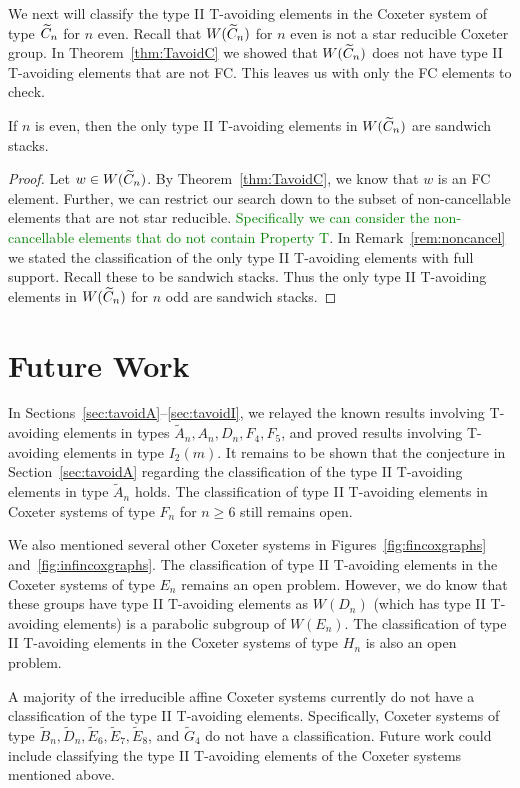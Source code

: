 We next will classify the type II T-avoiding elements in the Coxeter system of type $\widetilde{C}_n$ for $n$ even. Recall that $W(\widetilde{C}_n)$ for $n$ even is not a star reducible Coxeter group. In Theorem~\ref{thm:TavoidC} we showed that $W(\widetilde{C}_n)$ does not have type II T-avoiding elements that are not FC. This leaves us with only the FC elements to check.

\begin{theorem}
	If $n$ is even, then the only type II T-avoiding elements in $W(\widetilde{C}_n)$ are sandwich stacks.
	\begin{proof}
		Let $w \in W(\widetilde{C}_n)$. By Theorem~\ref{thm:TavoidC}, we know that $w$ is an FC element. Further, we can restrict our search down to the subset of non-cancellable elements that are not star reducible. \textcolor{green}{Specifically we can consider the non-cancellable elements that do not contain Property T}. In Remark~\ref{rem:noncancel} we stated the classification of the only type II T-avoiding elements with full support. Recall these to be sandwich stacks. Thus the only type II T-avoiding elements in $W(\widetilde{C}_n)$ for $n$ odd are sandwich stacks.
	\end{proof}
\end{theorem}


\section{Future Work}\label{sec:open}
In Sections~\ref{sec:tavoidA}--\ref{sec:tavoidI}, we relayed the known results involving T-avoiding elements in types $\widetilde{A}_n, A_n, D_n, F_4, F_5$, and proved results involving T-avoiding elements in type $I_2(m)$. It remains to be shown that the conjecture in Section~\ref{sec:tavoidA} regarding the classification of the type II T-avoiding elements in type $\widetilde{A}_n$ holds. The classification of type II T-avoiding elements in Coxeter systems of type $F_n$ for $n \geq 6$ still remains open.

We also mentioned several other Coxeter systems in Figures~\ref{fig:fincoxgraphs} and~\ref{fig:infincoxgraphs}. The classification of type II T-avoiding elements in the Coxeter systems of type $E_n$ remains an open problem. However, we do know that these groups have type II T-avoiding elements as $W(D_n)$ (which has type II T-avoiding elements) is a parabolic subgroup of $W(E_n)$. The classification of type II T-avoiding elements in the Coxeter systems of type $H_n$ is also an open problem. 

A majority of the irreducible affine Coxeter systems  currently do not have a classification of the type II T-avoiding elements. Specifically, Coxeter systems of type $\widetilde{B}_n, \widetilde{D}_n, \widetilde{E}_6, \widetilde{E}_7, \widetilde{E}_8$, and $\widetilde{G}_4$ do not have a classification. Future work could include classifying the type II T-avoiding elements of the Coxeter systems mentioned above.
